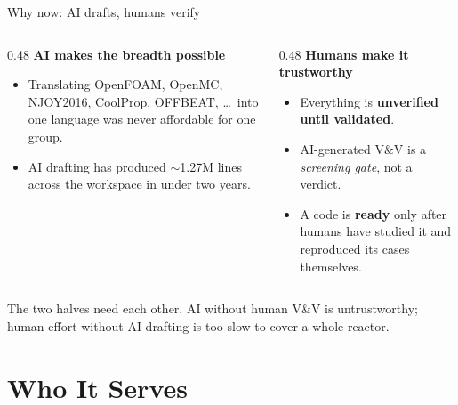 \documentclass[aspectratio=169]{beamer}
\begin{document}
\begin{frame}{Why now: AI drafts, humans verify}
    \begin{columns}[T]
        \begin{column}{0.48\textwidth}
            \textbf{AI makes the breadth possible}
            \begin{itemize}
                \footnotesize
                \item Translating OpenFOAM, OpenMC, NJOY2016, CoolProp,
                      OFFBEAT, \dots\ into one language was never
                      affordable for one group.
                \item AI drafting has produced $\sim$1.27M lines across the
                      workspace in under two years.
            \end{itemize}
        \end{column}
        \begin{column}{0.48\textwidth}
            \textbf{Humans make it trustworthy}
            \begin{itemize}
                \footnotesize
                \item Everything is \textbf{unverified until validated}.
                \item AI-generated V\&V is a \emph{screening gate}, not a
                      verdict.
                \item A code is \textbf{ready} only after humans have studied
                      it and reproduced its cases themselves.
            \end{itemize}
        \end{column}
    \end{columns}

    \medskip
    \footnotesize
    The two halves need each other. AI without human V\&V is untrustworthy;
    human effort without AI drafting is too slow to cover a whole reactor.
\end{frame}


\section{Who It Serves}
\end{document}

